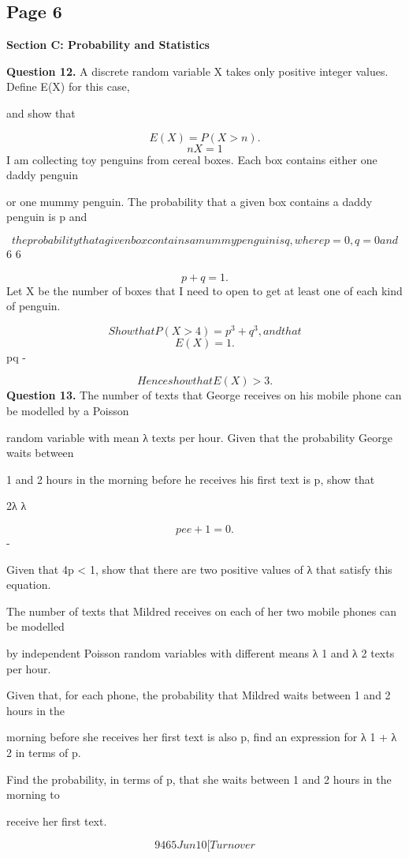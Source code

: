 \documentclass[12pt]{article}
\begin{document}
\subsection*{Page 6}
\begin{flushleft}
\bigskip\textbf{Section C: Probability and Statistics}\par
\bigskip\textbf{Question 12.} A discrete random variable X takes only positive integer values. Define E(X) for this case,\par
and show that\par
\infty\par
\[E(X) = P (X > n) .\]
\[nX=1\]
I am collecting toy penguins from cereal boxes. Each box contains either one daddy penguin\par
or one mummy penguin. The probability that a given box contains a daddy penguin is p and\par
\[the probability that a given box contains a mummy penguin is q, where p = 0, q = 0 and\]
6 6\par
\[p + q = 1 .\]
Let X be the number of boxes that I need to open to get at least one of each kind of penguin.\par
\[Show that P(X > 4) = p^3 + q^3, and that\]
\[E(X) = 1.\]
pq -\par
\[Hence show that E(X) > 3 .\]
\bigskip\textbf{Question 13.} The number of texts that George receives on his mobile phone can be modelled by a Poisson\par
random variable with mean λ texts per hour. Given that the probability George waits between\par
1 and 2 hours in the morning before he receives his first text is p, show that\par
2λ λ\par
\[pe e + 1 = 0.\]
-\par
Given that 4p < 1, show that there are two positive values of λ that satisfy this equation.\par
The number of texts that Mildred receives on each of her two mobile phones can be modelled\par
by independent Poisson random variables with different means λ 1 and λ 2 texts per hour.\par
Given that, for each phone, the probability that Mildred waits between 1 and 2 hours in the\par
morning before she receives her first text is also p, find an expression for λ 1 + λ 2 in terms of p.\par
Find the probability, in terms of p, that she waits between 1 and 2 hours in the morning to\par
receive her first text.\par
\[9465 Jun10 [Turn over\]
\end{flushleft}
\end{document}
